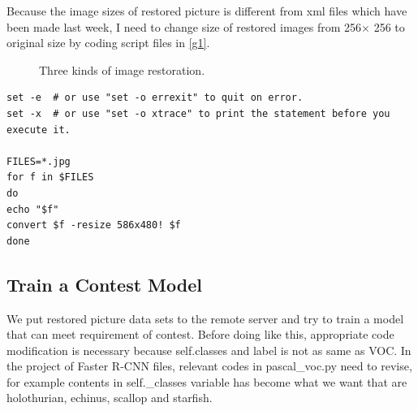 \documentclass[a4paper]{article}
\begin{document}
Because the image sizes of restored picture is different from xml files which have been made last week, I need to change size of restored images from 256$\times$ 256 to original size by coding script files in \ref{g1}.
\begin{figure}[!b]
	\centering 
	\caption{Three kinds of image restoration.} 
	\label{p1} %
\end{figure}

\lstset{language=bash}
\begin{lstlisting}
set -e  # or use "set -o errexit" to quit on error.
set -x  # or use "set -o xtrace" to print the statement before you execute it.

FILES=*.jpg
for f in $FILES
do
echo "$f"
convert $f -resize 586x480! $f
done  
\end{lstlisting}\label{g1}

\subsection{Train a Contest Model}

We put restored picture data sets to the remote server and try to train a model that can meet requirement of contest. Before doing like this, appropriate code modification is necessary because self.classes and label is not as same as VOC. In the project of Faster R-CNN files, relevant codes in pascal\_voc.py need to revise, for example contents in self.\_classes variable has become what we want that are holothurian, echinus, scallop and starfish.
\end{document}
